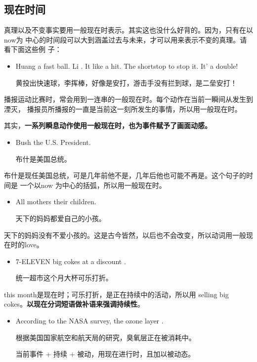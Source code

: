 \subsection{现在时间}

真理以及不变事实要用一般现在时表示。其实这也没什么好背的。因为，只有在以now为
中心的时间段可以大到涵盖过去与未来，才可以用来表示不变的真理。请看下面这些例
子：

\begin{itemize}
\item Huang  a fast ball. Li . It  like a hit. The shortstop
   to stop it. It' a double!

  黄投出快速球，李挥棒，好像是安打，游击手没有拦到球，是二垒安打！
\end{itemize}

播报运动比赛时，常会用到一连串的一般现在时。每个动作在当前一瞬间从发生到湮灭，
播报员所播报的一直是当前这一刻所发生的事情，所以用一般现在时。

其实，\textbf{一系列瞬息动作使用一般现在时，也为事件赋予了画面动感。}

\begin{itemize}
\item  Bush  the U.S. President.

  布什是美国总统。
\end{itemize}

布什是现任美国总统，可是几年前他不是，几年后他也可能不再是。这个句子的时间是
一个以now 为中心的括弧，所以用一般现在时。

\begin{itemize}
\item  All mothers  their children.

  天下的妈妈都爱自己的小孩。
\end{itemize}

天下的妈妈没有不爱小孩的。这是古今皆然，以后也不会改变，所以动词用一般现在时的love。

\begin{itemize}
\item  7-ELEVEN  big cokes at a discount .

  统一超市这个月大杯可乐打折。
\end{itemize}
this month是现在时；可乐打折，是正在持续中的活动，所以用 selling big
cokes。\textbf{以现在分词短语做补语来强调持续性}。

\begin{itemize}
\item According to the NASA survey, the ozone layer .

  根据美国国家航空和航天局的研究，臭氧层正在被消耗中。

  当前事件 + 持续 + 被动，用现在进行时，且加以被动态。
\end{itemize}


